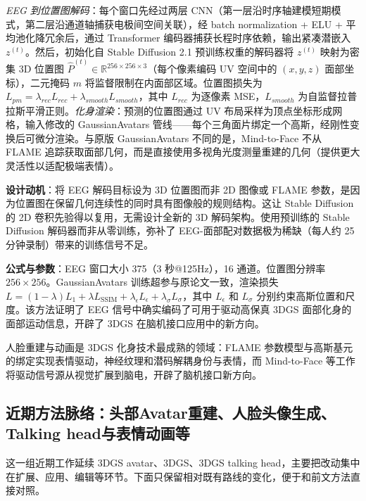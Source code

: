 \textit{EEG 到位置图解码}：每个窗口先经过两层 CNN（第一层沿时序轴建模短期模式，第二层沿通道轴捕获电极间空间关联），经 batch normalization + ELU + 平均池化降冗余后，通过 Transformer 编码器捕获长程时序依赖，输出紧凑潜嵌入 $z^{(t)}$。然后，初始化自 Stable Diffusion 2.1 预训练权重的解码器将 $z^{(t)}$ 映射为密集 3D 位置图 $\hat{P}^{(t)} \in \mathbb{R}^{256 \times 256 \times 3}$（每个像素编码 UV 空间中的 $(x, y, z)$ 面部坐标），二元掩码 $m$ 将监督限制在内面部区域。位置图损失为 $L_{pm} = \lambda_{rec} L_{rec} + \lambda_{smooth} L_{smooth}$，其中 $L_{rec}$ 为逐像素 MSE，$L_{smooth}$ 为自监督拉普拉斯平滑正则。\textit{化身渲染}：预测的位置图通过 UV 布局采样为顶点坐标形成网格，输入修改的 GaussianAvatars 管线——每个三角面片绑定一个高斯，经刚性变换后可微分渲染。与原版 GaussianAvatars 不同的是，Mind-to-Face 不从 FLAME 追踪获取面部几何，而是直接使用多视角光度测量重建的几何（提供更大灵活性以适配极端表情）。

\textbf{设计动机}：将 EEG 解码目标设为 3D 位置图而非 2D 图像或 FLAME 参数，是因为位置图在保留几何连续性的同时具有图像般的规则结构。这让 Stable Diffusion 的 2D 卷积先验得以复用，无需设计全新的 3D 解码架构。使用预训练的 Stable Diffusion 解码器而非从零训练，弥补了 EEG-面部配对数据极为稀缺（每人约 25 分钟录制）带来的训练信号不足。

\textbf{公式与参数}：EEG 窗口大小 375（3 秒@125Hz），16 通道。位置图分辨率 $256 \times 256$。GaussianAvatars 训练超参与原论文一致，渲染损失 $L = (1-\lambda)L_1 + \lambda L_{\text{SSIM}} + \lambda_\epsilon L_\epsilon + \lambda_\sigma L_\sigma$，其中 $L_\epsilon$ 和 $L_\sigma$ 分别约束高斯位置和尺度。该方法证明了 EEG 信号中确实编码了可用于驱动高保真 3DGS 面部化身的面部运动信息，开辟了 3DGS 在脑机接口应用中的新方向。

\begin{takeaway}
人脸重建与动画是 3DGS 化身技术最成熟的领域：FLAME 参数模型与高斯基元的绑定实现表情驱动，神经纹理和潜码解耦身份与表情，而 Mind-to-Face 等工作将驱动信号源从视觉扩展到脑电，开辟了脑机接口新方向。
\end{takeaway}


\subsection{近期方法脉络：头部Avatar重建、人脸头像生成、Talking head与表情动画等}

这一组近期工作延续 3DGS avatar、3DGS、3DGS talking head，主要把改动集中在扩展、应用、编辑等环节。下面只保留相对既有路线的变化，便于和前文方法直接对照。

